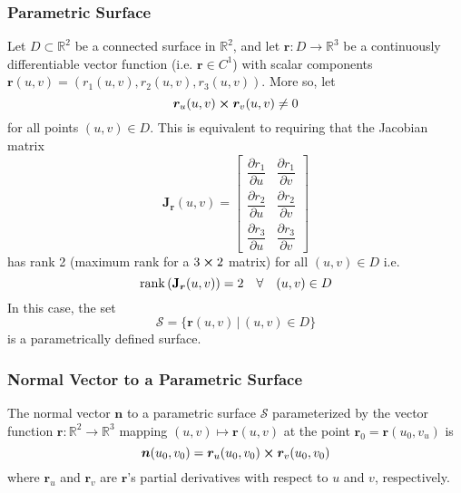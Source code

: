 \documentclass[11pt, a4paper]{article}
\begin{document}
\subsubsection{Parametric Surface}
Let $ D \subset \mathbb{R}^2 $ be a connected surface in $ \mathbb{R}^2 $, and let $ \bm{r}: D \rightarrow \mathbb{R}^3 $ be a continuously differentiable vector function (i.e. $ \bm{r} \in C^1 $) with scalar components $ \bm{r}(u, v) = (r_1(u, v), r_2(u, v), r_3(u, v)) $. More so, let 
\begin{equation*}
	\bm{r}_u(u, v) \cross \bm{r}_v(u, v) \neq 0
\end{equation*}
for all points $ (u, v) \in D $. This is equivalent to requiring that the Jacobian matrix 
	\[ \mathbf{J}_{\bm{r}}(u, v) =
	\begin{bmatrix}
		\dfrac{\partial r_1}{\partial u} & \dfrac{\partial r_1}{\partial v}\\[2.5ex]
		\dfrac{\partial r_2}{\partial u} & \dfrac{\partial r_2}{\partial v}\\[2.5ex]
		\dfrac{\partial r_3}{\partial u} & \dfrac{\partial r_3}{\partial v}
	\end{bmatrix}	
	\]
has rank 2 (maximum rank for a  $3 \cross 2$ matrix) for all $ (u, v) \in D $ i.e. 
\begin{equation*}
	\rank\left(\mathbf{J}_{\bm{r}}(u, v)\right) = 2 \quad \forall \quad  (u, v) \in D 
\end{equation*}
In this case, the set
\begin{equation*}
	\mathcal{S} = \{ \bm{r}(u, v) \, | \, (u, v) \in D \}
\end{equation*}
is a parametrically defined surface.



\subsubsection{Normal Vector to a Parametric Surface}
The normal vector $ \bm{n} $ to a parametric surface $ \mathcal{S} $ parameterized by the vector function $ \bm{r} : \mathbb{R}^2 \rightarrow \mathbb{R}^3 $ mapping $ (u, v) \mapsto \bm{r}(u, v) $ at the point $ \bm{r}_0 = \bm{r}(u_0, v_u)$ is 
\begin{equation*}
	\bm{n}(u_0, v_0) = \bm{r}_u (u_0, v_0) \cross \bm{r}_v (u_0, v_0)
\end{equation*}
where $ \bm{r}_u $ and $ \bm{r}_v $ are $ \bm{r} $'s partial derivatives with respect to $ u $ and $ v $, respectively.
\end{document}
